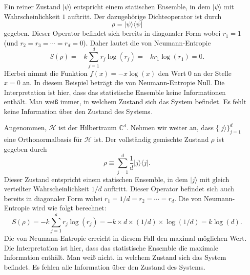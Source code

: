 \begin{beispiel}
  Ein reiner Zustand $|\psi\rangle$ entspricht einem statischen Ensemble, in dem $|\psi\rangle$ mit Wahrscheinlichkeit $1$ auftritt. Der dazugehörige Dichteoperator ist durch
  \begin{equation}
    \rho = |\psi\rangle\langle \psi|
  \end{equation}
  gegeben. Dieser Operator befindet sich bereits in diagonaler Form wobei $r_1 = 1$ (und $r_2 = r_3 = \cdots = r_d =0$). Daher lautet die von Neumann-Entropie
  \begin{equation}
    S(\rho) = -k\sum_{j=1}^d r_j\log(r_j) = -k r_1\log(r_1) = 0.
  \end{equation}
  Hierbei nimmt die Funktion $f(x) = -x\log(x)$ den Wert $0$ an der Stelle $x=0$ an. In diesem Beispiel beträgt die von Neumann-Entropie Null. Die Interpretation ist hier, dass das statistische Ensemble keine Informationen enthält. Man weiß immer, in welchem Zustand sich das System befindet. Es fehlt keine Information über den Zustand des Systems.
\end{beispiel}

\begin{beispiel}
  Angenommen, $\mathcal{H}$ ist der Hilbertraum $\mathbb{C}^d$. Nehmen wir weiter an, dass $\{|j\rangle \}_{j=1}^d$ eine Orthonormalbasis für $\mathcal{H}$ ist. Der vollständig gemischte Zustand $\rho$ ist gegeben durch
  \begin{equation}
    \rho \equiv \sum_{j=1}^d \frac{1}{d} |j\rangle\langle j|.
  \end{equation}
  Dieser Zustand entspricht einem statischen Ensemble, in dem $|j\rangle$ mit gleich verteilter Wahrscheinlichkeit $1/d$ auftritt. Dieser Operator befindet sich auch bereits in diagonaler Form wobei $r_1 = 1/d = r_2 = \cdots = r_d$. Die von Neumann-Entropie wird wie folgt berechnet:
  \begin{equation}
    S(\rho) = -k\sum_{j=1}^d r_j\log(r_j) = -k \times d \times  (1/d) \times \log(1/d) = k \log(d).
  \end{equation}
  Die von Neumann-Entropie erreicht in diesem Fall den maximal möglichen Wert. Die Interpretation ist hier, dass das statistische Ensemble die maximale Information enthält. Man weiß nicht, in welchem Zustand sich das System befindet. Es fehlen alle Information über den Zustand des Systems.
\end{beispiel}